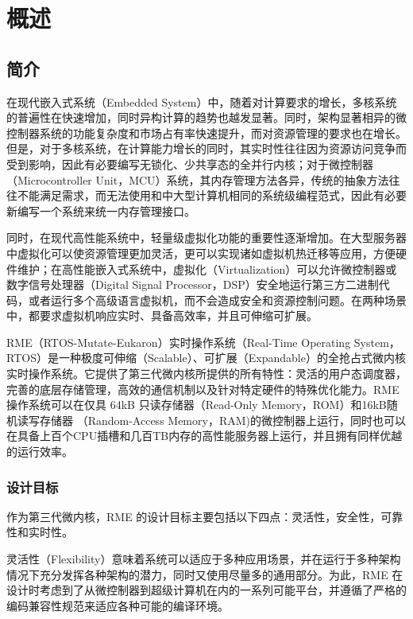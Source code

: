 \chapter{概述}\label{ch:overview}

\section{简介}\label{sec:1-introduction}

在现代嵌入式系统（Embedded
System）中，随着对计算要求的增长，多核系统的普遍性在快速增加，同时异构计算的趋势也越发显著。同时，架构显著相异的微控制器系统的功能复杂度和市场占有率快速提升，而对资源管理的要求也在增长。但是，对于多核系统，在计算能力增长的同时，其实时性往往因为资源访问竞争而受到影响，因此有必要编写无锁化、少共享态的全并行内核；对于微控制器（Microcontroller
Unit，MCU）系统，其内存管理方法各异，传统的抽象方法往往不能满足需求，而无法使用和中大型计算机相同的系统级编程范式，因此有必要新编写一个系统来统一内存管理接口。

同时，在现代高性能系统中，轻量级虚拟化功能的重要性逐渐增加。在大型服务器中虚拟化可以使资源管理更加灵活，更可以实现诸如虚拟机热迁移等应用，方便硬件维护；在高性能嵌入式系统中，虚拟化（Virtualization）可以允许微控制器或数字信号处理器（Digital
Signal
Processor，DSP）安全地运行第三方二进制代码，或者运行多个高级语言虚拟机，而不会造成安全和资源控制问题。在两种场景中，都要求虚拟机响应实时、具备高效率，并且可伸缩可扩展。

RME（RTOS-Mutate-Eukaron）实时操作系统（Real-Time Operating
System，RTOS）是一种极度可伸缩（Scalable）、可扩展（Expandable）的全抢占式微内核实时操作系统。它提供了第三代微内核所提供的所有特性：灵活的用户态调度器，完善的底层存储管理，高效的通信机制以及针对特定硬件的特殊优化能力。RME 操作系统可以在仅具 64kB 只读存储器（Read-Only Memory，ROM）和16kB随机读写存储器 （Random-Access
Memory，RAM)的微控制器上运行，同时也可以在具备上百个CPU插槽和几百TB内存的高性能服务器上运行，并且拥有同样优越的运行效率。

\subsection{设计目标}\label{subsec:1-design-goals}

作为第三代微内核，RME 的设计目标主要包括以下四点：灵活性，安全性，可靠性和实时性。

灵活性（Flexibility）意味着系统可以适应于多种应用场景，并在运行于多种架构情况下充分发挥各种架构的潜力，同时又使用尽量多的通用部分。为此，RME 在设计时考虑到了从微控制器到超级计算机在内的一系列可能平台，并遵循了严格的编码兼容性规范来适应各种可能的编译环境。

